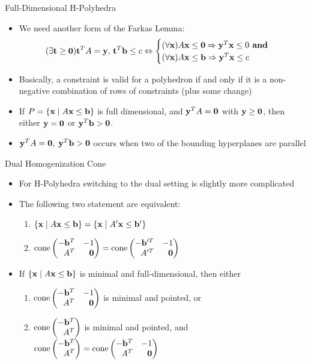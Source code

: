\documentclass{beamer}
\begin{document}
\begin{frame}{Full-Dimensional H-Polyhedra}
\begin{itemize}
  \item We need another form of the Farkas Lemma:
      \[ (\exists \mathbf{t}\geq\mathbf{0}) \mathbf{t}^T A = \mathbf{y},\, \mathbf{t}^T\mathbf{b} \leq c \Leftrightarrow
        \begin{cases}
        (\forall \mathbf{x}) A\mathbf{x}\leq \mathbf{0} \Rightarrow \mathbf{y}^T\mathbf{x} \leq 0 \textbf{ and } \\
        (\forall \mathbf{x}) A\mathbf{x}\leq \mathbf{b} \Rightarrow \mathbf{y}^T\mathbf{x} \leq c
        \end{cases}
      \]
  \item Basically, a constraint is valid for a polyhedron if and only if it is a non-negative combination of rows of constraints (plus some change)
  \item If $P = \left\{\mathbf{x}\;|\; A\mathbf{x}\leq \mathbf{b}\right\}$ is full dimensional, and $\mathbf{y}^T A = \mathbf{0}$ with $\mathbf{y}\geq\mathbf{0}$, then either $\mathbf{y} = \mathbf{0}$ or $\mathbf{y}^T \mathbf{b} > \mathbf{0}$.
  \item $\mathbf{y}^T A = \mathbf{0},\;\mathbf{y}^T \mathbf{b} > \mathbf{0}$ occurs when two of the bounding hyperplanes are parallel
\end{itemize}
\end{frame}

\begin{frame}{Dual Homogenization Cone}
\begin{itemize}
  \item For H-Polyhedra switching to the dual setting is slightly more complicated
  \item 	The following two statement are equivalent:
    \begin{enumerate}
      \item $\left\{\mathbf{x}\;|\; A\mathbf{x}\leq \mathbf{b}\right\} = \left\{\mathbf{x}\;|\; A'\mathbf{x}\leq \mathbf{b}'\right\}$
      \item $\cone \pmb -\vec{b}^T & -1 \\ A^T & \0 \pme = \cone \pmb -\vec{b}'^T & -1 \\ A'^T & \0 \pme$
    \end{enumerate}
  \item If $\left\{\mathbf{x}\;|\; A\mathbf{x}\leq \mathbf{b}\right\}$ is minimal and full-dimensional, then either 
    \begin{enumerate}
      \item $\cone \pmb -\vec{b}^T & -1 \\ A^T & \0 \pme$ is minimal and pointed, or
      \item $\cone \pmb -\vec{b}^T \\ A^T \pme$ is minimal and pointed, and $\cone\pmb -\vec{b}^T \\ A^T \pme = \cone \pmb -\vec{b}^T & -1 \\ A^T & \0 \pme$
    \end{enumerate}
\end{itemize}
\end{frame}
\end{document}
